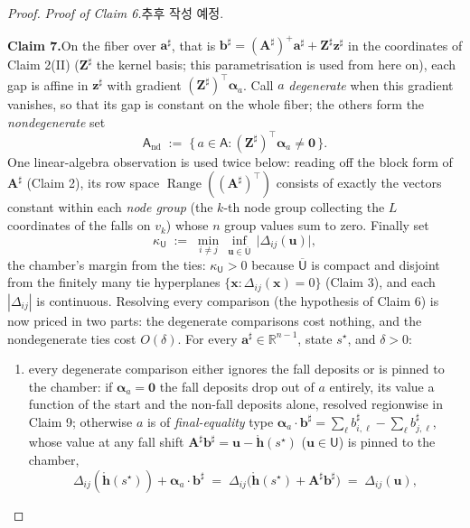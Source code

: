 \documentclass[11pt]{article}
\theoremstyle{definition}
\begin{document}
\begin{proof}
\noindent\emph{Proof of Claim 6.}\quad 추후 작성 예정.

\smallskip\noindent\textbf{Claim 7.}\quad On the fiber over $\mathbf{a}^{\sharp}$, that is $\mathbf{b}^{\sharp} = (\mathbf{A}^{\sharp})^{+}\mathbf{a}^{\sharp}+\mathbf{Z}^{\sharp}\mathbf{z}^{\sharp}$ in the coordinates of Claim 2(II) ($\mathbf{Z}^{\sharp}$ the kernel basis; this parametrisation is used from here on), each gap is affine in $\mathbf{z}^{\sharp}$ with gradient $(\mathbf{Z}^{\sharp})^{\top}\boldsymbol{\alpha}_a$. Call $a$ \emph{degenerate} when this gradient vanishes, so that its gap is constant on the whole fiber; the others form the \emph{nondegenerate} set
\[
  \mathsf{A}_{\mathrm{nd}} \;:=\; \bigl\{\,a\in\mathsf{A} : (\mathbf{Z}^{\sharp})^{\top}\boldsymbol{\alpha}_a\neq\mathbf{0}\,\bigr\}.
\]
One linear-algebra observation is used twice below: reading off the block form of $\mathbf{A}^{\sharp}$ (Claim 2), its row space $\operatorname{Range}((\mathbf{A}^{\sharp})^{\top})$ consists of exactly the vectors constant within each \emph{node group} (the $k$-th node group collecting the $L$ coordinates of the falls on $v_k$) whose $n$ group values sum to zero. Finally set
\[
  \kappa_{\mathsf{U}} \;:=\; \min_{i\neq j}\,\inf_{\mathbf{u}\in\overline{\mathsf{U}}}\,\bigl|\Delta_{ij}(\mathbf{u})\bigr| ,
\]
the chamber's margin from the ties: $\kappa_{\mathsf{U}}>0$ because $\overline{\mathsf{U}}$ is compact and disjoint from the finitely many tie hyperplanes $\{\mathbf{x} : \Delta_{ij}(\mathbf{x}) = 0\}$ (Claim 3), and each $|\Delta_{ij}|$ is continuous. Resolving every comparison (the hypothesis of Claim 6) is now priced in two parts: the degenerate comparisons cost nothing, and the nondegenerate ties cost $O(\delta)$. For every $\mathbf{a}^{\sharp}\in\mathbb{R}^{n-1}$, state $s^{\star}$, and $\delta>0$:
\begin{enumerate}[label=(\Roman*)]
  \item every degenerate comparison either ignores the fall deposits or is pinned to the chamber: if $\boldsymbol{\alpha}_a = \mathbf{0}$ the fall deposits drop out of $a$ entirely, its value a function of the start and the non-fall deposits alone, resolved regionwise in Claim 9; otherwise $a$ is of \emph{final-equality} type $\boldsymbol{\alpha}_a\cdot\mathbf{b}^{\sharp} = \sum_\ell b^{\sharp}_{i,\ell}-\sum_\ell b^{\sharp}_{j,\ell}$, whose value at any fall shift $\mathbf{A}^{\sharp}\mathbf{b}^{\sharp} = \mathbf{u}-\mathring{\mathbf{h}}(s^{\star})$ ($\mathbf{u}\in \mathsf{U}$) is pinned to the chamber,
  \[
    \Delta_{ij}(\mathring{\mathbf{h}}(s^{\star})) + \boldsymbol{\alpha}_a\cdot\mathbf{b}^{\sharp} \;=\; \Delta_{ij}\bigl(\mathring{\mathbf{h}}(s^{\star})+\mathbf{A}^{\sharp}\mathbf{b}^{\sharp}\bigr) \;=\; \Delta_{ij}(\mathbf{u}),
\]
\end{enumerate}
\end{proof}
\end{document}
